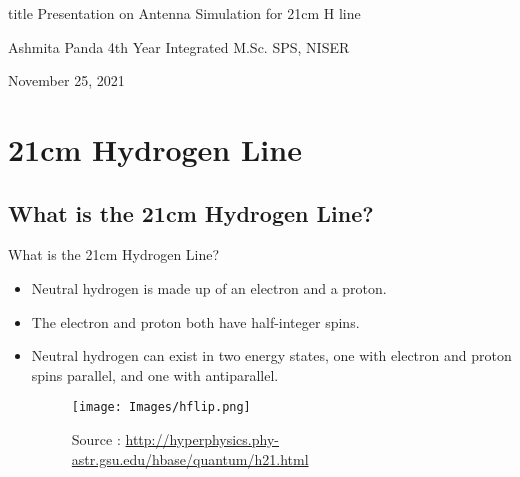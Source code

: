 \documentclass[12pt, dvipsnames]{beamer}
\begin{document}
\begin{frame}
    \vspace{\fill}
    \begin{beamercolorbox}[sep=8pt, center,shadow=true, rounded=true]{title}
        Presentation on \linebreak
        Antenna Simulation for 21cm H line
    \end{beamercolorbox}
    \begin{center}
      \footnotesize{
        Ashmita Panda  \linebreak
        4th Year Integrated M.Sc.\linebreak
        SPS, NISER \linebreak

        November 25, 2021 \linebreak
      }
    \end{center}
\end{frame}

%
\section{21cm Hydrogen Line}
\subsection{What is the 21cm Hydrogen Line?}
\begin{frame}{What is the 21cm Hydrogen Line?}
    \begin{itemize}
        \item Neutral hydrogen is made up of an electron and a proton.
        \item The electron and proton both have half-integer spins. 
        \item Neutral hydrogen can exist in two energy states, one with electron and proton spins parallel, and one with antiparallel.
        \begin{figure}
            \centering
            \texttt{[image: Images/hflip.png]}
            \caption{\tiny Source : \url{http://hyperphysics.phy-astr.gsu.edu/hbase/quantum/h21.html}}
        \end{figure}
    \end{itemize}
\end{frame}
\end{document}
